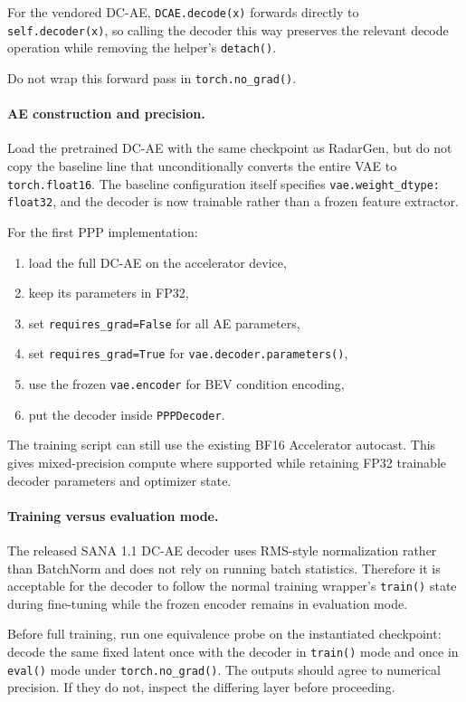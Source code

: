 \documentclass[11pt,a4paper]{article}
\begin{document}
For the vendored DC-AE, \texttt{DCAE.decode(x)} forwards directly to \texttt{self.decoder(x)}, so calling the decoder this way preserves the relevant decode operation while removing the helper's \texttt{detach()}.

Do not wrap this forward pass in \texttt{torch.no\_grad()}.

\paragraph{AE construction and precision.}
Load the pretrained DC-AE with the same checkpoint as RadarGen, but do not copy the baseline line that unconditionally converts the entire VAE to \texttt{torch.float16}. The baseline configuration itself specifies \texttt{vae.weight\_dtype: float32}, and the decoder is now trainable rather than a frozen feature extractor.

For the first PPP implementation:
\begin{enumerate}[label=\arabic*.]
    \item load the full DC-AE on the accelerator device,
    \item keep its parameters in FP32,
    \item set \texttt{requires\_grad=False} for all AE parameters,
    \item set \texttt{requires\_grad=True} for \texttt{vae.decoder.parameters()},
    \item use the frozen \texttt{vae.encoder} for BEV condition encoding,
    \item put the decoder inside \texttt{PPPDecoder}.
\end{enumerate}

The training script can still use the existing BF16 Accelerator autocast. This gives mixed-precision compute where supported while retaining FP32 trainable decoder parameters and optimizer state.

\paragraph{Training versus evaluation mode.}
The released SANA 1.1 DC-AE decoder uses RMS-style normalization rather than BatchNorm and does not rely on running batch statistics. Therefore it is acceptable for the decoder to follow the normal training wrapper's \texttt{train()} state during fine-tuning while the frozen encoder remains in evaluation mode.

Before full training, run one equivalence probe on the instantiated checkpoint: decode the same fixed latent once with the decoder in \texttt{train()} mode and once in \texttt{eval()} mode under \texttt{torch.no\_grad()}. The outputs should agree to numerical precision. If they do not, inspect the differing layer before proceeding.
\end{document}
